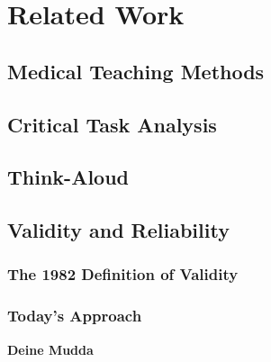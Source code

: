 \chapter{Related Work}\label{relatedwork}

\section{Medical Teaching Methods}
\section{Critical Task Analysis}
\section{Think-Aloud}

\section{Validity and Reliability}
\subsection{The 1982 Definition of Validity}
\subsection{Today's Approach}

\textbf{Deine Mudda}\cite{latex}